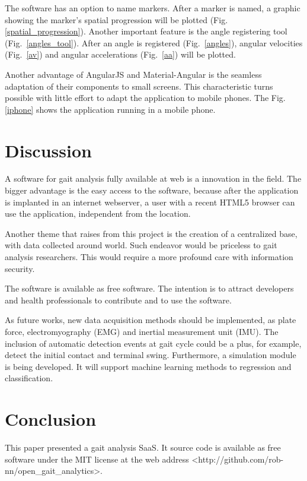 \documentclass[journal]{IEEEtran}
\begin{document}
The software has an option to name markers. After a marker is named, a graphic showing the 
marker's spatial progression will be plotted (Fig. \ref{spatial_progression}). 
Another important feature is the angle registering tool (Fig.~\ref{angles_tool}). 
After an angle is registered (Fig.~\ref{angles}), angular velocities (Fig.~\ref{av}) 
and angular accelerations (Fig.~\ref{aa}) will be plotted.

Another advantage of AngularJS and Material-Angular is the seamless adaptation of their components to small screens. This characteristic turns possible with little effort to adapt the application to mobile phones.
The Fig. \ref{iphone} shows the application running in a mobile phone.

\section{Discussion}

A software for gait analysis fully available at web is a innovation in the field.
The bigger advantage is the easy access to the software,
because after the application is implanted in an internet webserver, 
a user with a recent HTML5 browser can use the application, independent from
the location.

Another theme that raises from this project is the creation of a centralized 
base, with data collected around world. Such endeavor would be priceless
to gait analysis researchers. This would require a more profound care with 
information security.

The software is available as free software. The intention is to attract
developers and health professionals to contribute and to use the software.

As future works, new data acquisition methods should be implemented, as plate force, electromyography (EMG)
and inertial measurement unit (IMU). 
The inclusion of automatic detection events at gait cycle could be a plus, for example,
detect the initial contact and terminal swing.
Furthermore, a simulation module is being developed. 
It will support machine learning methods to regression and classification.


\section{Conclusion}
This paper presented a gait analysis SaaS. It source code is available as free software 
under the MIT license \cite{MIT2015} at the web address <http://github.com/rob-nn/open\_gait\_analytics>.
\end{document}
